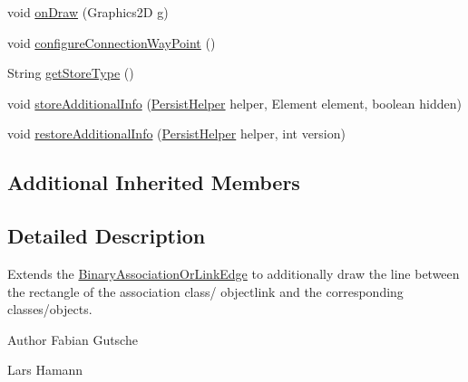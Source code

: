 \begin{DoxyCompactItemize}
\item 
void \hyperlink{classorg_1_1tzi_1_1use_1_1gui_1_1views_1_1diagrams_1_1elements_1_1edges_1_1_binary_association_class_or_object_ae06a6413c562fe22cc8ab40230756322}{on\-Draw} (Graphics2\-D g)
\item 
void \hyperlink{classorg_1_1tzi_1_1use_1_1gui_1_1views_1_1diagrams_1_1elements_1_1edges_1_1_binary_association_class_or_object_ae75e31add2b94fde9d83d0f20fd37f50}{configure\-Connection\-Way\-Point} ()
\item 
String \hyperlink{classorg_1_1tzi_1_1use_1_1gui_1_1views_1_1diagrams_1_1elements_1_1edges_1_1_binary_association_class_or_object_ad97a6fa42f4e0fafd0080d00092b810b}{get\-Store\-Type} ()
\item 
void \hyperlink{classorg_1_1tzi_1_1use_1_1gui_1_1views_1_1diagrams_1_1elements_1_1edges_1_1_binary_association_class_or_object_a643965562590b4b207257b1e00283c58}{store\-Additional\-Info} (\hyperlink{classorg_1_1tzi_1_1use_1_1gui_1_1util_1_1_persist_helper}{Persist\-Helper} helper, Element element, boolean hidden)
\item 
void \hyperlink{classorg_1_1tzi_1_1use_1_1gui_1_1views_1_1diagrams_1_1elements_1_1edges_1_1_binary_association_class_or_object_acb2cb9915a4483731889a5a4a2e57c2a}{restore\-Additional\-Info} (\hyperlink{classorg_1_1tzi_1_1use_1_1gui_1_1util_1_1_persist_helper}{Persist\-Helper} helper, int version)
\end{DoxyCompactItemize}
\subsection*{Additional Inherited Members}


\subsection{Detailed Description}
Extends the \hyperlink{classorg_1_1tzi_1_1use_1_1gui_1_1views_1_1diagrams_1_1elements_1_1edges_1_1_binary_association_or_link_edge}{Binary\-Association\-Or\-Link\-Edge} to additionally draw the line between the rectangle of the association class/ objectlink and the corresponding classes/objects.
\begin{DoxyItemize}
\item \begin{DoxyAuthor}{Author}
Fabian Gutsche 

Lars Hamann 
\end{DoxyAuthor}

\end{DoxyItemize}

